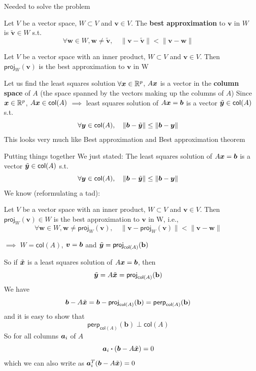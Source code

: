 \documentclass[aspectratio=169]{beamer}\usepackage[]{graphicx}\usepackage[]{xcolor}
\begin{document}
\begin{frame}{Needed to solve the problem}
\begin{definition}
Let $V$ be a vector space, $W\subset V$ and $\mathbf{v}\in V$. The \textbf{best approximation} to $\mathbf{v}$ in $W$ is $\tilde{\mathbf{v}}\in W$ s.t.
\[
\forall\mathbf{w}\in W, \mathbf{w}\neq\tilde{\mathbf{v}}, \quad
\|\mathbf{v}-\tilde{\mathbf{v}}\| < \|\mathbf{v}-\mathbf{w}\|
\]
\end{definition}
\vfill
\begin{theorem}
Let $V$ be a vector space with an inner product, $W\subset V$ and $\mathbf{v}\in V$. Then $\mathsf{proj}_W(\mathbf{v})$ is the best approximation to $\mathbf{v}$ in W
\end{theorem}
\end{frame}


\begin{frame}{Let us find the least squares solution}
$\forall \bm{x}\in\mathbb{R}^p$, $A\bm{x}$ is a vector in the \textbf{column space} of $A$ (the space spanned by the vectors making up the columns of $A$)
\vfill
Since $\bm{x}\in\mathbb{R}^p$, $A\bm{x}\in\mathsf{col}(A)$
\vfill
$\implies$ least squares solution of $A\bm{x}=\bm{b}$ is a vector $\tilde{\bm{y}}\in\mathsf{col}(A)$ s.t.
\[
\forall\bm{y}\in\mathsf{col}(A),\quad\|\bm{b}-\tilde{\bm{y}}\|\leq\|\bm{b}-\bm{y}\|
\]
\vfill
This looks very much like Best approximation and Best approximation theorem
\end{frame}

\begin{frame}{Putting things together}
We just stated: The least squares solution of $A\bm{x}=\bm{b}$ is a vector $\tilde{\bm{y}}\in\mathsf{col}(A)$ s.t.
\[
\forall\bm{y}\in\mathsf{col}(A),\quad\|\bm{b}-\tilde{\bm{y}}\|\leq\|\bm{b}-\bm{y}\|
\]
\vfill
We know (reformulating a tad):
\begin{theorem}
Let $V$ be a vector space with an inner product, $W\subset V$ and $\mathbf{v}\in V$. Then $\mathsf{proj}_W(\mathbf{v})\in W$ is the best approximation to $\mathbf{v}$ in W, i.e.,
\[
\forall\mathbf{w}\in W, \mathbf{w}\neq\mathsf{proj}_W(\mathbf{v}), \quad
\|\mathbf{v}-\mathsf{proj}_W(\mathbf{v})\| < \|\mathbf{v}-\mathbf{w}\|
\]
\end{theorem}
\vfill
$\implies$ $W=\mathsf{col}(A)$, $\bm{v}=\bm{b}$ and $\tilde{\bm{y}}=\mathsf{proj}_{\mathsf{col}(A)}(\mathbf{b})$
\end{frame}

\begin{frame}
So if $\tilde{\bm{x}}$ is a least squares solution of $A\bm{x}=\bm{b}$, then
\[
\tilde{\bm{y}} = A\tilde{\bm{x}} = \mathsf{proj}_{\mathsf{col}(A)}(\mathbf{b})
\]
\vfill
We have
\[
\bm{b}-A\tilde{\bm{x}} = \bm{b}-\mathsf{proj}_{\mathsf{col}(A)}(\mathbf{b}) 
= \mathsf{perp}_{\mathsf{col}(A)}(\mathbf{b})
\]
and it is easy to show that
\[
\mathsf{perp}_{\mathsf{col}(A)}(\mathbf{b}) \perp \mathsf{col}(A)
\]
\vfill
So for all columns $\bm{a}_i$ of $A$
\[
\bm{a}_i\boldsymbol{\cdot}(\bm{b}-A\tilde{\bm{x}}) = 0
\]
which we can also write as $\bm{a}_i^T(\bm{b}-A\tilde{\bm{x}}) = 0$
\end{frame}
\end{document}
